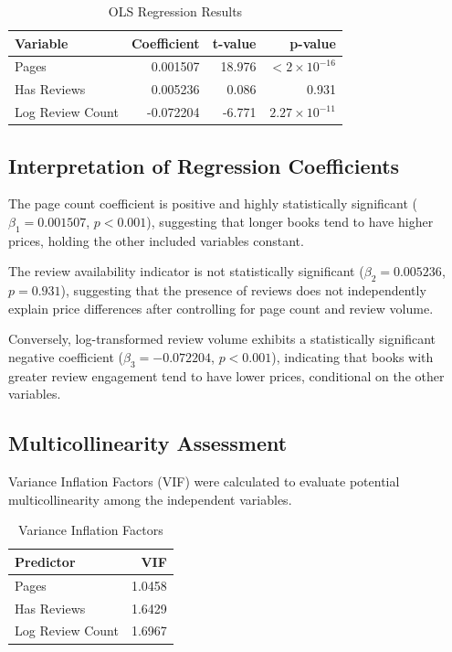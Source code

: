 \documentclass[11pt,a4paper]{article}
\begin{document}
\begin{table}[htbp]
\centering
\caption{OLS Regression Results}
\label{tab:ols_results}
\begin{tabular}{lrrr}
\toprule
Variable & Coefficient & t-value & p-value \\
\midrule
Pages & 0.001507 & 18.976 & $< 2 \times 10^{-16}$ \\
Has Reviews & 0.005236 & 0.086 & 0.931 \\
Log Review Count & -0.072204 & -6.771 & $2.27 \times 10^{-11}$ \\
\bottomrule
\end{tabular}
\end{table}

\subsection{Interpretation of Regression Coefficients}

The page count coefficient is positive and highly statistically significant ($\beta_1=0.001507$, $p<0.001$), suggesting that longer books tend to have higher prices, holding the other included variables constant.

The review availability indicator is not statistically significant ($\beta_2=0.005236$, $p=0.931$), suggesting that the presence of reviews does not independently explain price differences after controlling for page count and review volume.

Conversely, log-transformed review volume exhibits a statistically significant negative coefficient ($\beta_3=-0.072204$, $p<0.001$), indicating that books with greater review engagement tend to have lower prices, conditional on the other variables.

\subsection{Multicollinearity Assessment}

Variance Inflation Factors (VIF) were calculated to evaluate potential multicollinearity among the independent variables.

\begin{table}[htbp]
\centering
\caption{Variance Inflation Factors}
\label{tab:vif_results}
\begin{tabular}{lr}
\toprule
Predictor & VIF \\
\midrule
Pages & 1.0458 \\
Has Reviews & 1.6429 \\
Log Review Count & 1.6967 \\
\bottomrule
\end{tabular}
\end{table}
\end{document}
